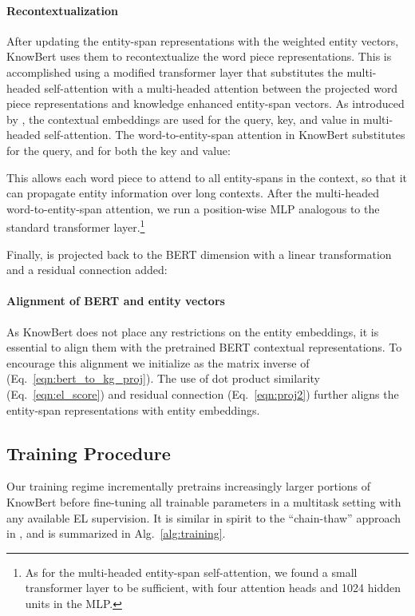 \documentclass[11pt,a4paper]{article}
\newcommand{\KBS}[0]{KnowBert }
\begin{document}
\paragraph{Recontextualization}
After updating the entity-span representations with the weighted entity vectors, \KBS uses them to recontextualize the word piece representations.
This is accomplished using a modified transformer layer that substitutes the multi-headed self-attention with a multi-headed attention between the projected word piece representations and knowledge enhanced entity-span vectors.
As introduced by \citet{Vaswani2017AttentionIA}, the contextual embeddings  are used for the query, key, and value in multi-headed self-attention.
The word-to-entity-span attention in \KBS substitutes  for the query, and  for both the key and value:

This allows each word piece to attend to all entity-spans in the context, so that it can propagate entity information over long contexts.
After the multi-headed word-to-entity-span attention, we run a position-wise MLP analogous to the standard transformer layer.\footnote{As for the multi-headed entity-span self-attention, we found a small transformer layer to be sufficient, with four attention heads and 1024 hidden units in the MLP.}

Finally,  is projected back to the BERT dimension with a linear transformation and a residual connection added:


\paragraph{Alignment of BERT and entity vectors}
As \KBS does not place any restrictions on the entity embeddings, it is essential to align them with the pretrained BERT contextual representations.
To encourage this alignment we initialize   as the matrix inverse of  (Eq.~\ref{eqn:bert_to_kg_proj}).
The use of dot product similarity (Eq.~\ref{eqn:el_score}) and residual connection (Eq.~\ref{eqn:proj2}) further aligns the entity-span representations with entity embeddings.



\subsection{Training Procedure}
\label{sec:training}
Our training regime incrementally pretrains increasingly larger portions of \KBS before fine-tuning all trainable parameters in a multitask setting with any available EL supervision.  It is similar in spirit to the ``chain-thaw'' approach in \citet{Felbo2017UsingMO}, and is summarized in Alg.~\ref{alg:training}.
\end{document}
